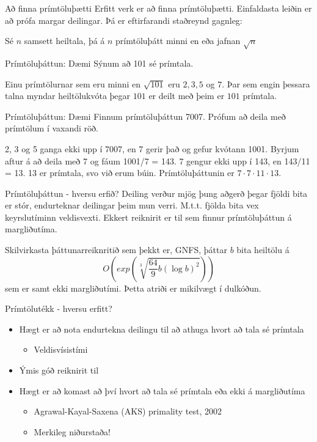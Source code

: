 \documentclass{beamer}
\begin{document}
\begin{frame}{Að finna prímtöluþætti}
Erfitt verk er að finna prímtöluþætti. Einfaldasta leiðin er að prófa margar deilingar. Þá er eftirfarandi staðreynd gagnleg:
\begin{tcolorbox}
Sé $n$ samsett heiltala, þá á $n$ prímtöluþátt minni en eða jafnan $\sqrt{n}$
\end{tcolorbox}
\end{frame}

\begin{frame}{Prímtöluþáttun: Dæmi}
Sýnum að 101 sé prímtala.

Einu prímtölurnar sem eru minni en $\sqrt{101}$ eru $2, 3, 5$ og $7$. Þar sem engin þessara talna myndar heiltölukvóta þegar $101$ er deilt með þeim er $101$ prímtala.
\end{frame}

\begin{frame}{Prímtöluþáttun: Dæmi}
Finnum prímtöluþáttun 7007. Prófum að deila með prímtölum í vaxandi röð.

2, 3 og 5 ganga ekki upp í 7007, en 7 gerir það og gefur kvótann 1001. Byrjum aftur á að deila með 7 og fáum 1001/7 = 143. 7 gengur ekki upp í 143, en 143/11 = 13. 13 er prímtala, svo við erum búin. Prímtöluþáttunin er $7 \cdot 7 \cdot 11 \cdot 13$.
\end{frame}

\begin{frame}{Prímtöluþáttun - hversu erfið?}
Deiling verður mjög þung aðgerð þegar fjöldi bita er stór, endurteknar deilingar þeim mun verri. M.t.t. fjölda bita vex keyrslutíminn veldisvexti. Ekkert reiknirit er til sem finnur prímtöluþáttun á margliðutíma.

Skilvirkasta þáttunarreiknritið sem þekkt er, GNFS, þáttar $b$ bita heiltölu á 
\[
 O \left(exp\left(\sqrt[3]{\frac{64}{9}b(\log b)^2}\right)\right)
\]
sem er samt ekki margliðutími. Þetta atriði er mikilvægt í dulkóðun.
\end{frame}

\begin{frame}{Prímtölutékk - hversu erfitt?}
\begin{itemize}
 \item Hægt er að nota endurtekna deilingu til að athuga hvort að tala sé prímtala
 \begin{itemize}
  \item Veldisvísistími
 \end{itemize}
 \item Ýmis góð reiknirit til
 \item Hægt er að komast að því hvort að tala sé prímtala eða ekki á margliðutíma
 \begin{itemize}
  \item Agrawal-Kayal-Saxena (AKS) primality test, 2002
  \item Merkileg niðurstaða!
 \end{itemize}
\end{itemize}
\end{frame}
\end{document}
